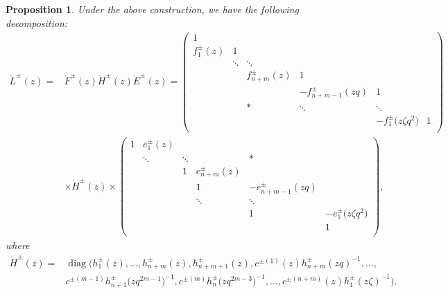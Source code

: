 \documentclass[pdftex]{sigma}
\numberwithin{equation}{section}
\newtheorem{Proposition}[Theorem]{Proposition}
 { \theoremstyle{definition}
\newtheorem{Definition}[Theorem]{Definition}
\newtheorem{Note}[Theorem]{Note}
\newtheorem{Example}[Theorem]{Example}
\newtheorem{Remark}[Theorem]{Remark} }
\begin{document}
\begin{Proposition}\label{FHE}
Under the above construction, we have the following decomposition:
\begin{align*}
 \dot{L}^{\pm}(z)={}&\dot{F}^{\pm}(z)\dot{H}^{\pm}(z)\dot{E}^{\pm}(z)=\left(
 \begin{matrix}
 1 & & & & & \\
 f_1^{\pm}(z) & 1 & & & & \\
 & \ddots & \ddots & & & \\
 & & f_{n+m}^{\pm}(z) & 1 & & \\
 & & & -f_{n+m-1}^{\pm}(zq) &1 & \\
 & & * & \ddots& \ddots & \\
 & & & & -f_{1}^{\pm}\bigl(z\zeta q^2\bigr) & 1 \\
 \end{matrix}
 \right)\\
 & \times \dot{H}^{\pm}(z)\times
 \left(
 \begin{matrix}
 1 & e_1^{\pm}(z) & & & & \\
 & \ddots & \ddots & & * & \\
 & & 1 & e_{n+m}^{\pm}(z) & & \\
 & & & 1 & -e_{n+m-1}^{\pm}(zq) & \\
 & & & \ddots & \ddots & \\
 & & & & 1 & -e_{1}^{\pm}\bigl(z\zeta q^2\bigr) \\
 & & & & & 1\\
 \end{matrix}
 \right),
\end{align*}
where
 \begin{align*}
\dot{H}^{\pm}(z)={}&\operatorname{diag}\bigl(h_1^{\pm}(z), \dots, h_{n+m}^{\pm}(z), h_{n+m+1}^{\pm}(z), c^{\pm(1)}(z)h_{n+m}^{\pm}(zq)^{-1} ,\dots,\\
& c^{\pm ( m-1)}h_{n+1}^{\pm}\bigl(zq^{2m-1}\bigr)^{-1},
c^{\pm( m)}h_{n}^{\pm}\bigl(zq^{2m-3}\bigr)^{-1},\dots,
c^{\pm(n+m)}(z)h_{1}^{\pm}(z\zeta)^{-1}\bigr).
\end{align*}
\end{Proposition}
\end{document}
